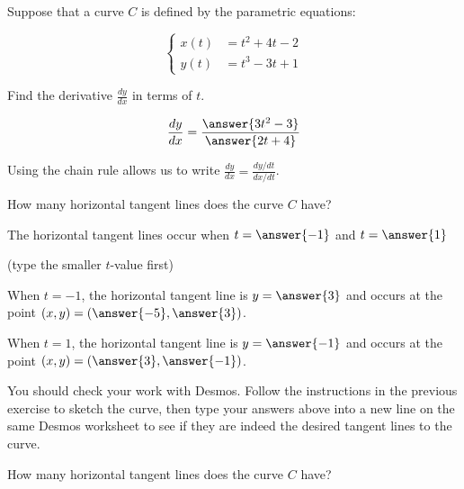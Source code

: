 \documentclass{ximera}
\author{Jim Talamo}
\begin{document}
\begin{exercise}

Suppose that a curve $C$ is defined by the parametric equations:

\[
\begin{cases}
x(t) &= t^2+4t-2 \\
y(t) &= t^3-3t+1
\end{cases}
\]

Find the derivative $\frac{dy}{dx}$ in terms of $t$.

\[
\frac{dy}{dx} = \frac{\answer{3t^2-3}}{\answer{2t+4}}
\]

\begin{hint}
Using the chain rule allows us to write $\frac{dy}{dx} = \frac{dy/dt}{dx/dt}$.
\end{hint}

\begin{exercise}
How many horizontal tangent lines does the curve $C$ have?
\begin{multipleChoice}
\end{multipleChoice}

The horizontal tangent lines occur when $t=\answer{-1}$ and $t=\answer{1}$

(type the smaller $t$-value first)

\begin{exercise}
When $t=-1$, the horizontal tangent line is $y=\answer{3}$ and occurs at the point $(x,y) = \left(\answer{-5},\answer{3}\right)$.

When $t=1$, the horizontal tangent line is $y=\answer{-1}$ and occurs at the point $(x,y) = \left(\answer{3},\answer{-1}\right)$.

\begin{exercise}
You should check your work with Desmos.  Follow the instructions in the previous exercise to sketch the curve, then type your answers above into a new line on the same Desmos worksheet to see if they are indeed the desired tangent lines to the curve.
\end{exercise}

\end{exercise}
\end{exercise}

\begin{exercise}
How many horizontal tangent lines does the curve $C$ have?
\begin{multipleChoice}
\end{multipleChoice}


\end{exercise}
\end{exercise}
\end{document}
